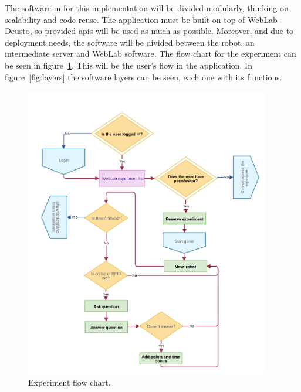 The software in for this implementation will be divided modularly, thinking on scalability and
code reuse. The application must be built on top of WebLab-Deusto, so provided \acrshort{api}s will
be used as much as possible. Moreover, and due to deployment needs, the software will be divided
between the robot, an intermediate server and WebLab software. The flow chart for the experiment can
be seen in figure~\ref{fig:exp_flow}. This will be the user's flow in the application. In
figure~\ref{fig:layers} the software layers can be seen, each one with its functions.

\clearpage
\begin{figure}
	\centering
	\includegraphics[width=0.95\textwidth]{fig/experiment-flow}
	\caption{Experiment flow chart.}
	\label{fig:exp_flow}
\end{figure}

